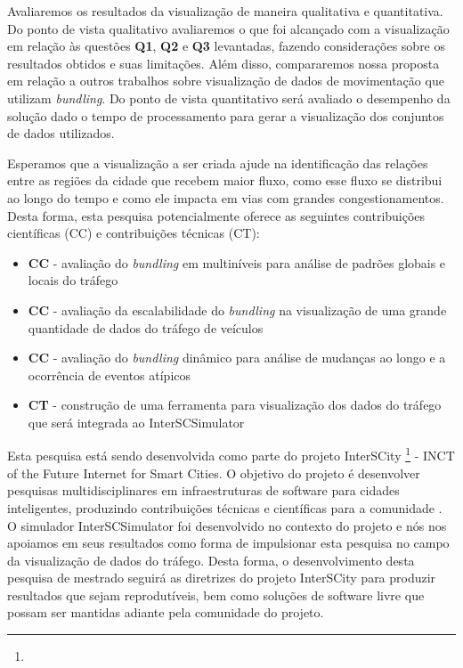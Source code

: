   Avaliaremos os resultados da visualização de maneira qualitativa e
quantitativa. Do ponto de vista qualitativo avaliaremos o que foi alcançado com
a visualização em relação às questões \textbf{Q1}, \textbf{Q2} e \textbf{Q3}
levantadas, fazendo considerações sobre os resultados obtidos e suas
limitações. Além disso, compararemos nossa proposta em relação a outros
trabalhos sobre visualização de dados de movimentação que utilizam
\emph{bundling}. Do ponto de vista quantitativo será avaliado o desempenho da
solução dado o tempo de processamento para gerar a visualização dos conjuntos
de dados utilizados.

  Esperamos que a visualização a ser criada ajude na identificação das relações
entre as regiões da cidade que recebem maior fluxo, como esse fluxo se
distribui ao longo do tempo e como ele impacta em vias com grandes
congestionamentos. Desta forma, esta pesquisa potencialmente oferece as
seguintes contribuições científicas (CC) e contribuições técnicas (CT):

\begin{itemize}
  \item \textbf{CC} - avaliação do \emph{bundling} em multiníveis para análise de
padrões globais e locais do tráfego

  \item \textbf{CC} - avaliação da escalabilidade do \emph{bundling} na visualização de uma grande
quantidade de dados do tráfego de veículos

  \item \textbf{CC} - avaliação do \emph{bundling} dinâmico para análise de mudanças ao longo
e a ocorrência de eventos atípicos

  \item \textbf{CT} - construção de uma ferramenta para visualização dos dados do tráfego
que será integrada ao InterSCSimulator
\end{itemize}

Esta pesquisa está sendo desenvolvida como parte do projeto InterSCity
\footnote{} - INCT of the Future Internet for Smart
Cities. O objetivo do projeto é desenvolver pesquisas multidisciplinares em
infraestruturas de software para cidades inteligentes, produzindo contribuições
técnicas e científicas para a comunidade \citep{Daniel2016}. O simulador InterSCSimulator foi
desenvolvido no contexto do projeto e nós nos apoiamos em seus resultados como
forma de impulsionar esta pesquisa no campo da visualização de dados do
tráfego. Desta forma, o desenvolvimento desta pesquisa de mestrado seguirá as
diretrizes do projeto InterSCity para produzir resultados que sejam
reprodutíveis, bem como soluções de software livre que possam ser mantidas
adiante pela comunidade do projeto.
